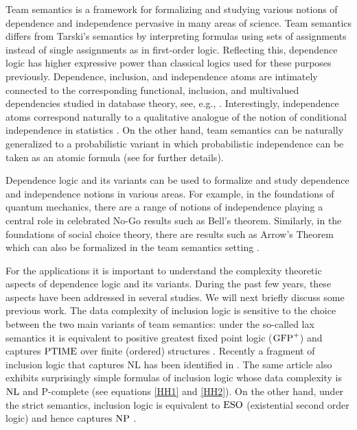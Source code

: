 \documentclass{article}
\theoremstyle{plain}
\theoremstyle{definition}
\newcommand{\ESO}{{\rm ESO}}
\newcommand{\np}{{\rm NP}}
\newcommand{\Ptime}{{\rm PTIME}}
\newcommand{\nl}{{\rm NL}}
\newcommand{\PGFP}{{\rm GFP}^+}
\begin{document}
  
Team semantics is a  framework for formalizing and studying  various notions of dependence and independence  pervasive in many areas of science.  Team semantics differs from Tarski's semantics by interpreting formulas using sets of assignments instead of single assignments as in  first-order logic.  
 Reflecting this, dependence logic  has higher expressive power than classical logics used for these purposes previously.  Dependence, inclusion, and independence  atoms are intimately connected to the  corresponding functional, inclusion, and multivalued  dependencies studied in  database theory, see, e.g., \cite{DBLP:conf/foiks/HannulaK14}.  Interestingly, independence atoms correspond naturally to a qualitative analogue of the notion of conditional independence in statistics  \cite{DBLP:journals/networks/GeigerVP90}. On the other hand,  team semantics can be naturally generalized to a probabilistic variant in which probabilistic independence can be taken  as an atomic formula (see \cite{HannulaHKKV19,HKMV18} for further details). 

 Dependence logic and its variants can be  used to formalize and study dependence and independence notions in various areas. For example, in the foundations of quantum mechanics, there  are a range of notions of independence playing a central role in celebrated No-Go results such as Bell's theorem. 
Similarly, in the foundations of social choice theory, there are results such as Arrow's Theorem which  can also be formalized in the team semantics setting   \cite{2014arXiv1409.5537H,PacuitY16}.


For the applications it is important to understand the complexity theoretic aspects  of dependence logic and its variants. During the past few years,  these aspects have been addressed in several studies. We will next briefly discuss some previous work. 
The data complexity of inclusion logic  is sensitive to the choice between the two main variants of team semantics: under the so-called  lax semantics it is equivalent to positive greatest fixed point logic ($\PGFP$) and captures $\Ptime$ over finite (ordered) structures \cite{gallhella13}. Recently a  fragment of inclusion logic that captures $\textrm{NL}$ has been identified in \cite{HannulaH19}. The same article also exhibits surprisingly simple formulas of inclusion logic whose data complexity is $\nl$ and $\mathrm{P}$-complete (see equations  \eqref{HH1} and \eqref{HH2}).
 On the other hand, under the strict semantics, inclusion logic is equivalent to $\ESO$ (existential second order logic) and hence captures $\np$ \cite{galhankon13}.  
\end{document}
